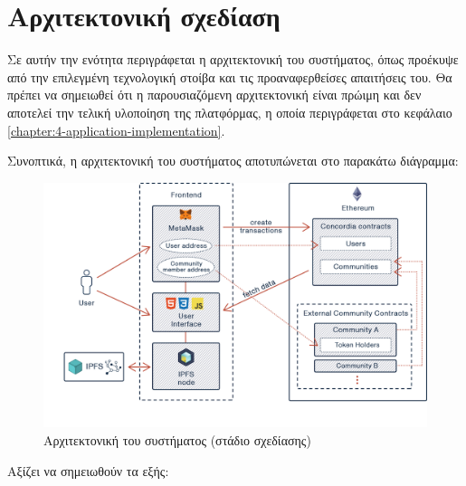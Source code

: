 \newpage
\section{Αρχιτεκτονική σχεδίαση} \label{section:3-7-architecture-design}

Σε αυτήν την ενότητα περιγράφεται η αρχιτεκτονική του συστήματος, όπως προέκυψε από την επιλεγμένη τεχνολογική στοίβα και τις προαναφερθείσες απαιτήσεις του. Θα πρέπει να σημειωθεί ότι η παρουσιαζόμενη αρχιτεκτονική είναι πρώιμη και δεν αποτελεί την τελική υλοποίηση της πλατφόρμας, η οποία περιγράφεται στο κεφάλαιο \ref{chapter:4-application-implementation}. 

Συνοπτικά, η αρχιτεκτονική του συστήματος αποτυπώνεται στο παρακάτω διάγραμμα:
\vspace{\baselineskip}
\begin{figure}[H]
    \centering
    \includegraphics[width=\textwidth]{assets/figures/chapter-3/3.7.architecture-design}
    \caption{Αρχιτεκτονική του συστήματος (στάδιο σχεδίασης)}
\end{figure}

\vspace{\baselineskip}

Αξίζει να σημειωθούν τα εξής:

